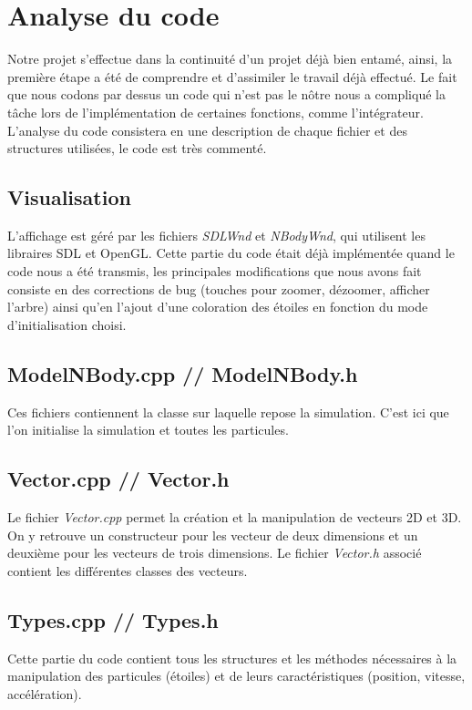 \chapter{Analyse du code}

Notre projet s'effectue dans la continuité d'un projet déjà bien entamé, ainsi, la première étape a été de comprendre et d'assimiler le travail déjà effectué. Le fait que nous codons par dessus un code qui n'est pas le nôtre nous a compliqué la tâche lors de l'implémentation de certaines fonctions, comme l'intégrateur. L'analyse du code consistera en une description de chaque fichier et des structures utilisées, le code est très commenté.

\section{Visualisation}
L'affichage est géré par les fichiers \textit{SDLWnd} et \textit{NBodyWnd}, qui utilisent les libraires SDL et OpenGL. Cette partie du code était déjà implémentée quand le code nous a été transmis, les principales modifications que nous avons fait consiste en des corrections de bug (touches pour zoomer, dézoomer, afficher l'arbre) ainsi qu'en l'ajout d'une coloration des étoiles en fonction du mode d'initialisation choisi.

\section{ModelNBody.cpp // ModelNBody.h}
Ces fichiers contiennent la classe sur laquelle repose la simulation. C'est ici que l'on initialise la simulation et toutes les particules.

\section{Vector.cpp // Vector.h}
Le fichier \textit{Vector.cpp} permet la création et la manipulation de vecteurs 2D et 3D. On y retrouve un constructeur pour les vecteur de deux dimensions et un deuxième pour les vecteurs de trois dimensions. Le fichier \textit{Vector.h} associé contient les différentes classes des vecteurs.

\section{Types.cpp // Types.h}
Cette partie du code contient tous les structures et les méthodes nécessaires à la manipulation des particules (étoiles) et de leurs caractéristiques (position, vitesse, accélération).

